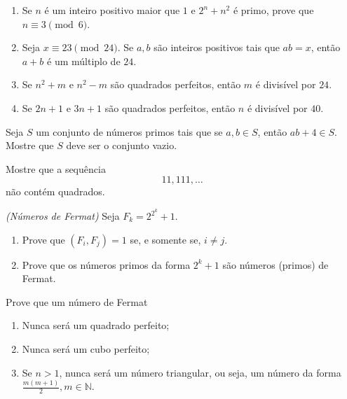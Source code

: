 \begin{questao}
  \begin{enumerate}

    \item Se $n$ é um inteiro positivo maior que $1$ e $2^n+n^2$ é
    primo, prove que $n \equiv 3 \pmod{6}$.

    \item Seja $x \equiv 23 \pmod{24}$. Se $a,b$ são inteiros
    positivos tais que $ab=x$, então $a+b$ é um múltiplo de $24$.

    \item Se $n^2+m$ e $n^2-m$ são quadrados perfeitos, então $m$
    é divisível por $24$.

    \item Se $2n+1$ e $3n+1$ são quadrados perfeitos, então $n$ é
    divisível por $40$.
  \end{enumerate}
\end{questao}

\begin{questao}
  Seja $S$ um conjunto de números primos tais que se $a,b \in S$,
  então $ab+4 \in S$. Mostre que $S$ deve ser o conjunto vazio.
\end{questao}

\begin{questao}
  Mostre que a sequência $$11,111,\ldots$$ não contém quadrados.
\end{questao}

\begin{questao}
  {\it(Números de Fermat)} Seja $F_k = 2^{2^k}+1$.
  \begin{enumerate}

    \item Prove que $(F_i,F_j) = 1$ se, e somente se, $i \not = j$.

    \item Prove que os números primos da forma $2^k+1$ são números
    (primos) de Fermat.
  \end{enumerate}
\end{questao}

\begin{questao}
  Prove que um número de Fermat
  \begin{enumerate}

    \item Nunca será um quadrado perfeito;

    \item Nunca será um cubo perfeito;

    \item Se $n>1$, nunca será um número triangular, ou seja, um
    número da forma $\frac{m(m+1)}{2}, m \in \mathbb{N}$.
  \end{enumerate}
\end{questao}

